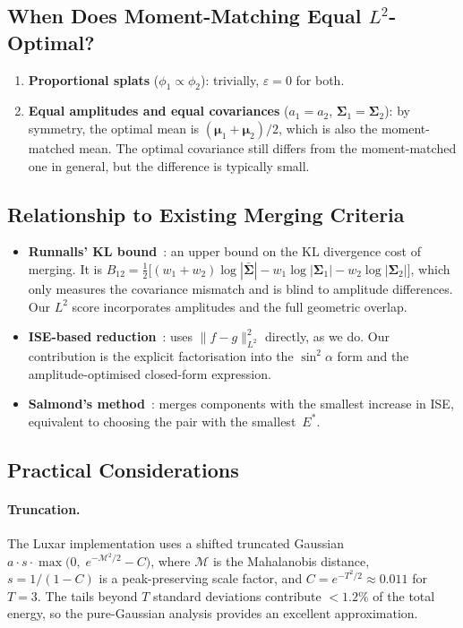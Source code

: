 \documentclass[11pt, a4paper]{article}
\theoremstyle{plain}
\theoremstyle{definition}
\theoremstyle{remark}
\newcommand{\bmu}{\bm{\mu}}
\newcommand{\Sig}{\bm{\Sigma}}
\newcommand{\Sigbar}{\bar{\bm{\Sigma}}}
\begin{document}
\subsection{When Does Moment-Matching Equal \texorpdfstring{$L^2$}{L2}-Optimal?}

\begin{enumerate}
\item \textbf{Proportional splats}
  ($\phi_1 \propto \phi_2$): trivially, $\varepsilon = 0$ for
  both.
\item \textbf{Equal amplitudes and equal covariances}
  ($a_1 = a_2$, $\Sig_1 = \Sig_2$): by symmetry, the optimal
  mean is $(\bmu_1{+}\bmu_2)/2$, which is also the
  moment-matched mean.  The optimal covariance still differs
  from the moment-matched one in general, but the difference is
  typically small.
\end{enumerate}

\subsection{Relationship to Existing Merging Criteria}

\begin{itemize}
\item \textbf{Runnalls' KL bound}~\citep{runnalls2007}: an upper
  bound on the KL divergence cost of merging.  It is
  $B_{12} = \frac{1}{2}\bigl[(w_1{+}w_2)\log|\Sigbar|
  - w_1\log|\Sig_1| - w_2\log|\Sig_2|\bigr]$,
  which only measures the covariance mismatch and is blind to
  amplitude differences.  Our $L^2$ score incorporates amplitudes
  and the full geometric overlap.

\item \textbf{ISE-based reduction}~\citep{williams2003, scott2001}:
  uses $\|f - g\|^2_{L^2}$ directly, as we do.  Our contribution is
  the explicit factorisation into the $\sin^2\!\alpha$ form and the
  amplitude-optimised closed-form expression.

\item \textbf{Salmond's method}~\citep{salmond1990}: merges components
  with the smallest increase in ISE, equivalent to choosing the pair
  with the smallest~$E^*$.
\end{itemize}

\subsection{Practical Considerations}

\paragraph{Truncation.}
The Luxar implementation uses a shifted truncated Gaussian
$a \cdot s \cdot \max\!\bigl(0,\; e^{-\mathcal{M}^2/2} - C\bigr)$,
where $\mathcal{M}$ is the Mahalanobis distance,
$s = 1/(1{-}C)$ is a peak-preserving scale factor, and
$C = e^{-T^2/2} \approx 0.011$ for $T=3$.  The tails beyond
$T$ standard deviations contribute $< 1.2\%$ of the total energy,
so the pure-Gaussian analysis provides an excellent approximation.
\end{document}
